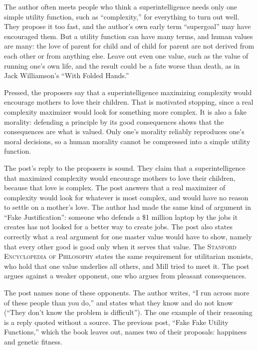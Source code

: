 \begin{afterword}
\summaryhead

The author often meets people who think a superintelligence needs only one simple utility function, such as ``complexity,'' for everything to turn out well. They propose it too fast, and the author's own early term ``supergoal'' may have encouraged them. But a utility function can have many terms, and human values are many: the love of parent for child and of child for parent are not derived from each other or from anything else. Leave out even one value, such as the value of running one's own life, and the result could be a fate worse than death, as in Jack Williamson's ``With Folded Hands.''

Pressed, the proposers say that a superintelligence maximizing complexity would encourage mothers to love their children. That is motivated stopping, since a real complexity maximizer would look for something more complex. It is also a fake morality: defending a principle by its good consequences shows that the consequences are what is valued. Only one's morality reliably reproduces one's moral decisions, so a human morality cannot be compressed into a simple utility function.

\responsehead

The post's reply to the proposers is sound. They claim that a superintelligence that maximized complexity would encourage mothers to love their children, because that love is complex. The post answers that a real maximizer of complexity would look for whatever is most complex, and would have no reason to settle on a mother's love. The author had made the same kind of argument in ``Fake Justification'': someone who defends a \$1 million laptop by the jobs it creates has not looked for a better way to create jobs. The post also states correctly what a real argument for one master value would have to show, namely that every other good is good only when it serves that value. The \textsc{Stanford Encyclopedia of Philosophy} states the same requirement for utilitarian monists, who hold that one value underlies all others, and Mill tried to meet it. The post argues against a weaker opponent, one who argues from pleasant consequences.

The post names none of these opponents. The author writes, ``I run across more of these people than you do,'' and states what they know and do not know (``They don't know the problem is difficult''). The one example of their reasoning is a reply quoted without a source. The previous post, ``Fake Fake Utility Functions,'' which the book leaves out, names two of their proposals: happiness and genetic fitness.


\end{afterword}
